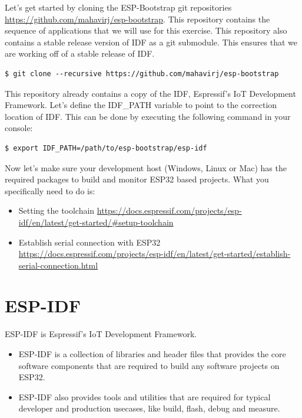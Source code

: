 \documentclass[11pt,fleqn]{book} %
\begin{document}
Let's get started by cloning the ESP-Bootstrap git repositories \url{https://github.com/mahavirj/esp-bootstrap}. This repository contains the sequence of applications that we will use for this exercise. This repository also contains a stable release version of IDF as a git submodule. This ensures that we are working off of a stable release of IDF.

\begin{verbatim}
$ git clone --recursive https://github.com/mahavirj/esp-bootstrap
\end{verbatim}

This repository already contains a copy of the IDF, Espressif's IoT Development Framework. Let's define the IDF\_PATH variable to point to the correction location of IDF. This can be done by executing the following command in your console:

\begin{verbatim}
$ export IDF_PATH=/path/to/esp-bootstrap/esp-idf
\end{verbatim}

Now let's make sure your development host (Windows, Linux or Mac) has the required packages to build and monitor ESP32 based projects. What you specifically need to do is:
\begin{itemize}
    \item Setting the toolchain \url{https://docs.espressif.com/projects/esp-idf/en/latest/get-started/#setup-toolchain}
    \item Establish serial connection with ESP32 \url{https://docs.espressif.com/projects/esp-idf/en/latest/get-started/establish-serial-connection.html}
\end{itemize}

\section{ESP-IDF}

ESP-IDF is Espressif's IoT Development Framework. 
\begin{itemize}
    \item ESP-IDF is a collection of libraries and header files that provides the core software components that are required to build any software projects on ESP32. 
    \item ESP-IDF also provides tools and utilities that are required for typical developer and production usecases, like build, flash, debug and measure.
\end{itemize}
\end{document}
